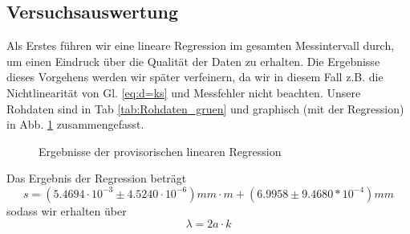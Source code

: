 \documentclass[12pt,a4paper]{article}
\begin{document}
\subsection{Versuchsauswertung}
Als Erstes führen wir eine lineare Regression im gesamten Messintervall durch, um einen Eindruck über die Qualität der Daten zu erhalten. Die Ergebnisse dieses Vorgehens werden wir später verfeinern, da wir in diesem Fall z.B. die Nichtlinearität von Gl. \ref{eq:d=ks} und Messfehler nicht beachten. Unsere Rohdaten sind in Tab \ref{tab:Rohdaten_gruen} und graphisch (mit der Regression) in Abb. \ref{fig:lambdarohlinreg} zusammengefasst.
\begin{figure}[H]
	\centering
	\qquad
	\caption{Ergebnisse der provisorischen linearen Regression}
	\label{fig:lambdarohlinreg}
\end{figure}
Das Ergebnis der Regression beträgt
\begin{equation*}
s = (5.4694\cdot10^{-3}\pm4.5240\cdot10^{-6})mm\cdot m+(6.9958\pm9.4680*10^{-4})mm
\end{equation*}
sodass wir erhalten über
\begin{equation}
	\lambda = 2a\cdot k
	\label{eq:l=2ak}
\end{equation}
\end{document}
